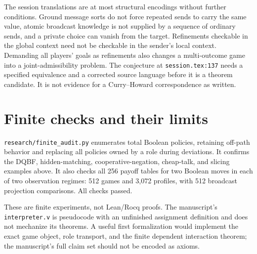 \documentclass[11pt]{article}
\begin{document}
The session translations are at most structural encodings without further
conditions. Ground message sorts do not force repeated sends to carry the same
value, atomic broadcast knowledge is not supplied by a sequence of ordinary
sends, and a private choice can vanish from the target. Refinements checkable in
the global context need not be checkable in the sender's local context. Demanding
all players' goals as refinements also changes a multi-outcome game into a
joint-admissibility problem. The conjecture at \texttt{session.tex:137} needs a
specified equivalence and a corrected source language before it is a theorem
candidate. It is not evidence for a Curry--Howard correspondence as written.

\section{Finite checks and their limits}

\texttt{research/finite\_audit.py} enumerates total Boolean policies, retaining
off-path behavior and replacing all policies owned by a role during deviations.
It confirms the DQBF, hidden-matching, cooperative-negation, cheap-talk, and
slicing examples above. It also checks all 256 payoff tables for two Boolean
moves in each of two observation regimes: 512 games and 3,072 profiles, with 512
broadcast projection comparisons. All checks passed.

These are finite experiments, not Lean/Rocq proofs. The manuscript's
\texttt{interpreter.v} is pseudocode with an unfinished assignment definition and
does not mechanize its theorems. A useful first formalization would implement
the exact game object, role transport, and the finite dependent interaction
theorem; the manuscript's full claim set should not be encoded as axioms.
\end{document}
